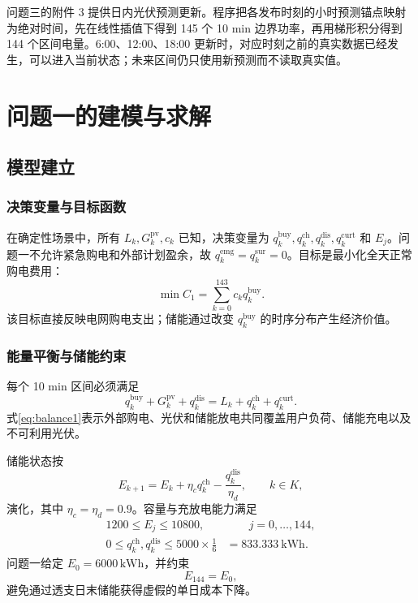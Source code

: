 \documentclass[withoutpreface]{cumcmthesis}
\newcommand{\qbuy}{q^{\mathrm{buy}}}
\newcommand{\qch}{q^{\mathrm{ch}}}
\newcommand{\qdis}{q^{\mathrm{dis}}}
\newcommand{\qemg}{q^{\mathrm{emg}}}
\newcommand{\qcurt}{q^{\mathrm{curt}}}
\newcommand{\qsur}{q^{\mathrm{sur}}}
\begin{document}
问题三的附件 3 提供日内光伏预测更新。程序把各发布时刻的小时预测锚点映射为绝对时间，先在线性插值下得到 145 个 10 min 边界功率，再用梯形积分得到 144 个区间电量。6:00、12:00、18:00 更新时，对应时刻之前的真实数据已经发生，可以进入当前状态；未来区间仍只使用新预测而不读取真实值。

\section{问题一的建模与求解}
\subsection{模型建立}
\subsubsection{决策变量与目标函数}
在确定性场景中，所有 $L_k,G_k^{\mathrm{pv}},c_k$ 已知，决策变量为 $\qbuy_k,\qch_k,\qdis_k,\qcurt_k$ 和 $E_j$。问题一不允许紧急购电和外部计划盈余，故 $\qemg_k=\qsur_k=0$。目标是最小化全天正常购电费用：
\begin{equation}
\min C_1=\sum_{k=0}^{143} c_k\qbuy_k.
\label{eq:q1obj}
\end{equation}
该目标直接反映电网购电支出；储能通过改变 $\qbuy_k$ 的时序分布产生经济价值。

\subsubsection{能量平衡与储能约束}
每个 10 min 区间必须满足
\begin{equation}
\qbuy_k+G_k^{\mathrm{pv}}+\qdis_k
=L_k+\qch_k+\qcurt_k.
\label{eq:balance1}
\end{equation}
式\eqref{eq:balance1}表示外部购电、光伏和储能放电共同覆盖用户负荷、储能充电以及不可利用光伏。

储能状态按
\begin{equation}
E_{k+1}=E_k+\eta_c\qch_k-\frac{\qdis_k}{\eta_d},
\qquad k\in K,
\label{eq:soc}
\end{equation}
演化，其中 $\eta_c=\eta_d=0.9$。容量与充放电能力满足
\begin{align}
1200\le E_j\le10800,&\qquad j=0,\ldots,144,\\
0\le\qch_k,\qdis_k\le5000\times\frac16
&=833.333\ \mathrm{kWh}.
\end{align}
问题一给定 $E_0=6000\,\mathrm{kWh}$，并约束
\begin{equation}
E_{144}=E_0,
\end{equation}
避免通过透支日末储能获得虚假的单日成本下降。
\end{document}

